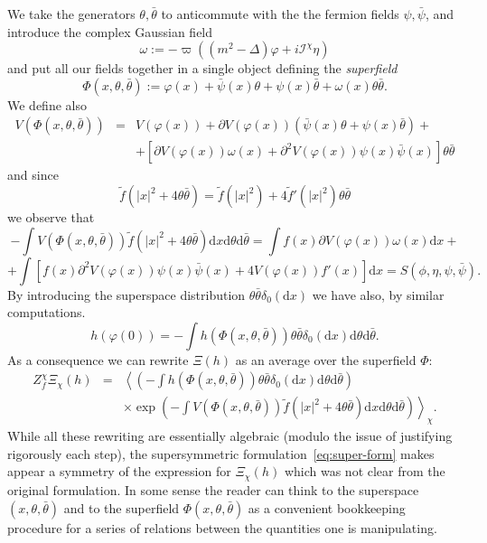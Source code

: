 \documentclass[a4paper,10pt]{article}
\newcommand{\assign}{:=}
\newcommand{\mathd}{\mathrm{d}}
\newcommand{\tmtextit}[1]{{\itshape{#1}}}
\begin{document}
We take the generators $\theta, \bar{\theta}$ to anticommute with the the
fermion fields $\psi, \bar{\psi}$, and introduce the complex Gaussian field
\[ \omega \assign - \varpi ((m^2 - \Delta) \varphi + i \mathcal{I}^{\chi}
   \eta) \]
and put all our fields together in a single object defining the
\tmtextit{superfield}
\[ \Phi (x, \theta, \bar{\theta}) \assign \varphi (x) + \bar{\psi} (x) \theta
   + \psi (x) \bar{\theta} + \omega (x) \theta \bar{\theta} . \]
We define also
\begin{eqnarray*}
  V (\Phi (x, \theta, \bar{\theta})) & = & V (\varphi (x)) + \partial V
  (\varphi (x)) (\bar{\psi} (x) \theta + \psi (x) \bar{\theta}) +\\
  &  & + [\partial V (\varphi (x)) \omega (x) + \partial^2 V (\varphi (x))
  \psi (x) \bar{\psi} (x)] \theta \bar{\theta}
\end{eqnarray*}
and since
\[ \tilde{f} (| x |^2 + 4 \theta \bar{\theta}) = \tilde{f} (| x |^2) + 4
   \tilde{f}' (| x |^2) \theta \bar{\theta} \]
we observe that
\[ - \int V (\Phi (x, \theta, \bar{\theta})) \tilde{f} (| x |^2 + 4 \theta
   \bar{\theta}) \mathd x \mathd \theta \mathd \bar{\theta} = \int f (x)
   \partial V (\varphi (x)) \omega (x) \mathd x + \]
\[ + \int [f (x) \partial^2 V (\varphi (x)) \psi (x) \bar{\psi} (x) + 4 V
   (\varphi (x)) f' (x)] \mathd x = S (\phi, \eta, \psi, \bar{\psi}) . \]
By introducing the superspace distribution $\theta \bar{\theta} \delta_0
(\mathd x)$ we have also, by similar computations.
\[ h (\varphi (0)) = - \int h (\Phi (x, \theta, \bar{\theta})) \theta
   \bar{\theta} \delta_0 (\mathd x) \mathd \theta \mathd \bar{\theta} . \]
As a consequence we can rewrite $\Xi (h)$ as an average over the superfield
$\Phi$:
\begin{eqnarray}
  Z_f^{\chi} \Xi_{\chi} (h) & = & \left. \left\langle \left( - \int h (\Phi
  (x, \theta, \bar{\theta})) \theta \bar{\theta} \delta_0 (\mathd x) \mathd
  \theta \mathd \bar{\theta} \right) \right. \right. \nonumber\\
  &  & \times \left. \exp \left( - \int V (\Phi (x, \theta, \bar{\theta}))
  \tilde{f} (| x |^2 + 4 \theta \bar{\theta}) \mathd x \mathd \theta \mathd
  \bar{\theta} \right) \right\rangle_{\chi}.  \label{eq:super-form}
\end{eqnarray}
While all these rewriting are essentially algebraic (modulo the issue of
justifying rigorously each step), the supersymmetric
formulation~{\eqref{eq:super-form}} makes appear a symmetry of the expression
for $\Xi_{\chi} (h)$ which was not clear from the original formulation. In
some sense the reader can think to the superspace $(x, \theta, \bar{\theta})$
and to the superfield $\Phi (x, \theta, \bar{\theta})$ as a convenient
bookkeeping procedure for a series of relations between the quantities one is
manipulating.
\end{document}
